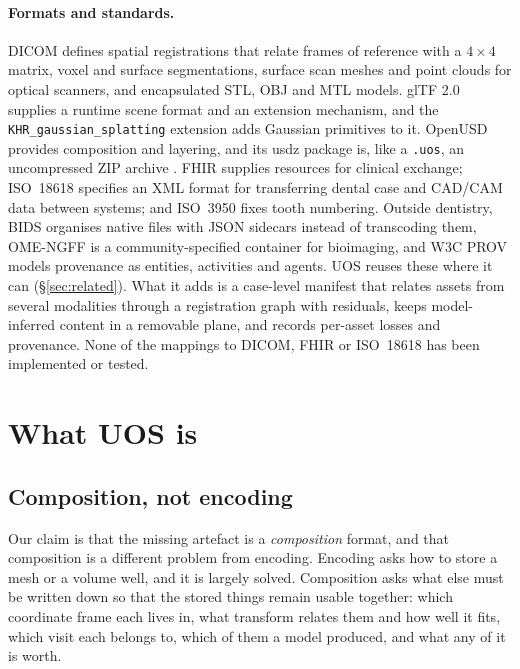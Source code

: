 \documentclass[11pt,a4paper]{article}
\newcommand{\code}[1]{\texttt{\small #1}}
\begin{document}
\paragraph{Formats and standards.} DICOM \cite{dicom} defines spatial registrations that
relate frames of reference with a $4\times4$ matrix, voxel and surface segmentations, surface
scan meshes and point clouds for optical scanners, and encapsulated STL, OBJ and MTL models.
glTF 2.0 \cite{gltf} supplies a runtime scene format and an extension mechanism, and the
\code{KHR\_gaussian\_splatting} extension \cite{khrgs} adds Gaussian primitives to it.
OpenUSD \cite{aousd} provides composition and layering, and its usdz package is, like a
\code{.uos}, an uncompressed ZIP archive \cite{usdz}. FHIR \cite{fhir} supplies resources for
clinical exchange; ISO~18618 \cite{iso18618} specifies an XML format for transferring dental
case and CAD/CAM data between systems; and ISO~3950 \cite{iso3950} fixes tooth numbering.
Outside dentistry, BIDS \cite{bids} organises native files with JSON sidecars instead of
transcoding them, OME-NGFF \cite{omengff} is a community-specified container for bioimaging,
and W3C PROV \cite{provdm} models provenance as entities, activities and agents. UOS reuses
these where it can (\S\ref{sec:related}). What it adds is a case-level manifest that relates
assets from several modalities through a registration graph with residuals, keeps
model-inferred content in a removable plane, and records per-asset losses and provenance.
None of the mappings to DICOM, FHIR or ISO~18618 has been implemented or tested.

\section{What UOS is}\label{sec:what}

\subsection{Composition, not encoding}

Our claim is that the missing artefact is a \emph{composition} format, and that composition
is a different problem from encoding. Encoding asks how to store a mesh or a volume well,
and it is largely solved. Composition asks what else must be written down so that the stored
things remain usable together: which coordinate frame each lives in, what transform relates
them and how well it fits, which visit each belongs to, which of them a model produced, and
what any of it is worth.
\end{document}
